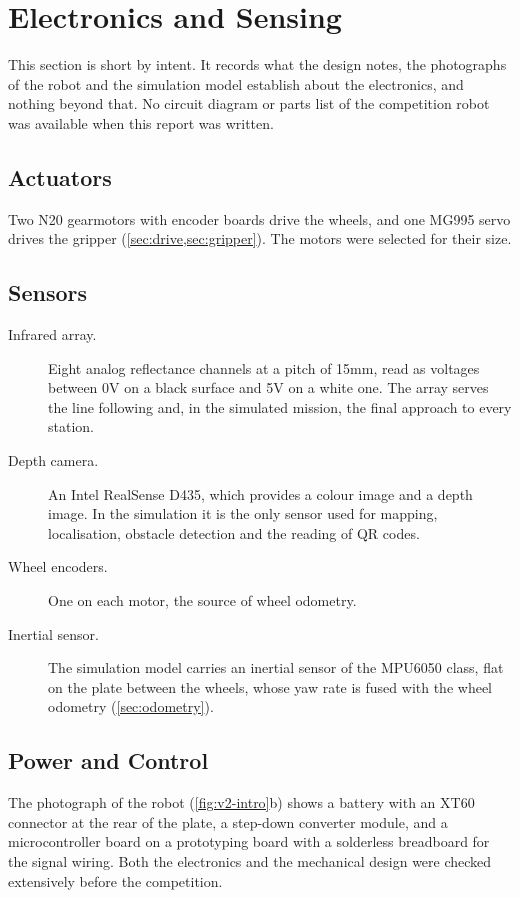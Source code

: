 \section{Electronics and Sensing}
\label{sec:electronics}

This section is short by intent. It records what the design notes, the photographs of the
robot and the simulation model establish about the electronics, and nothing beyond that. No
circuit diagram or parts list of the competition robot was available when this report was
written.

\subsection{Actuators}
Two N20 gearmotors with encoder boards drive the wheels, and one MG995 servo drives the
gripper (\cref{sec:drive,sec:gripper}). The motors were selected for their size.

\subsection{Sensors}
\begin{description}
  \item[Infrared array.] Eight analog reflectance channels at a pitch of 15\unit{mm}, read as
        voltages between 0\unit{V} on a black surface and 5\unit{V} on a white one. The
        array serves the line following and, in the simulated mission, the final approach to
        every station.
  \item[Depth camera.] An Intel RealSense D435, which provides a colour image and a depth
        image. In the simulation it is the only sensor used for mapping, localisation,
        obstacle detection and the reading of QR codes.
  \item[Wheel encoders.] One on each motor, the source of wheel odometry.
  \item[Inertial sensor.] The simulation model carries an inertial sensor of the MPU6050
        class, flat on the plate between the wheels, whose yaw rate is fused with the wheel
        odometry (\cref{sec:odometry}).
\end{description}

\subsection{Power and Control}
The photograph of the robot (\cref{fig:v2-intro}b) shows a battery with an XT60 connector
at the rear of the plate, a step-down converter module, and a
microcontroller board on a prototyping board with a solderless breadboard for the signal
wiring. Both the electronics and the mechanical design were checked extensively before the
competition.


